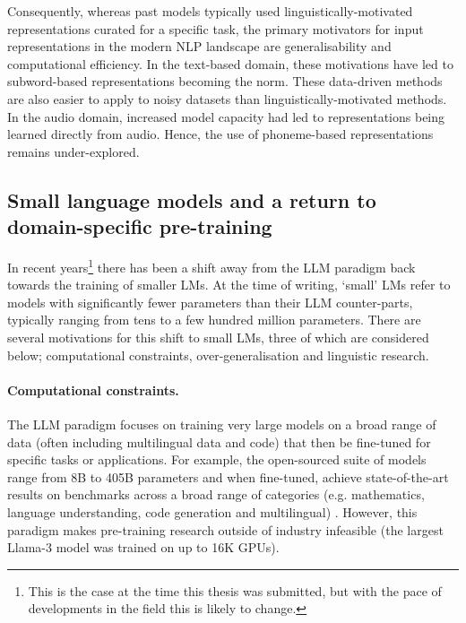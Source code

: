 Consequently, whereas past models typically used linguistically-motivated representations curated for a specific task, the primary motivators for input representations in the modern NLP landscape are generalisability and computational efficiency. In the text-based domain, these motivations have led to subword-based representations becoming the norm. These data-driven methods are also easier to apply to noisy datasets than linguistically-motivated methods. In the audio domain, increased model capacity had led to representations being learned directly from audio. Hence, the use of phoneme-based representations remains under-explored. 

\subsection{Small language models and a return to domain-specific pre-training}


In recent years\footnote{This is the case at the time this thesis was submitted, but with the pace of developments in the field this is likely to change.} there has been a shift away from the LLM paradigm back towards the training of smaller LMs. At the time of writing, `small' LMs  refer to models with significantly fewer parameters than their LLM counter-parts, typically ranging from tens to a few hundred million parameters. There are several motivations for this shift to small LMs, three of which are considered below; computational constraints, over-generalisation and linguistic research.

\paragraph{Computational constraints.} The LLM paradigm focuses on training very large models on a broad range of data (often including multilingual data and code) that then be fine-tuned for specific tasks or applications. For example, the open-sourced  suite of models range from 8B to 405B parameters and when fine-tuned, achieve state-of-the-art results on benchmarks across a broad range of categories (e.g. mathematics, language understanding, code generation and multilingual) \citep{grattafiori2024llama}. However, this paradigm makes pre-training research outside of industry infeasible (the largest Llama-3 model was trained on up to 16K GPUs).

